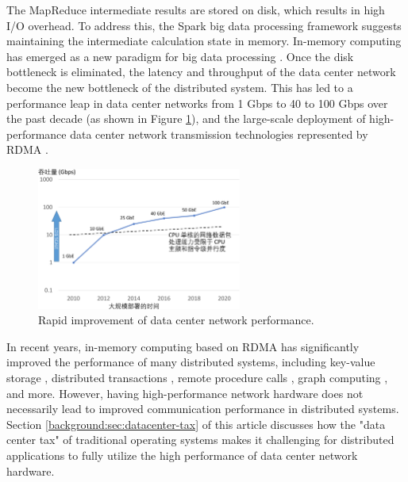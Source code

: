 The MapReduce intermediate results are stored on disk, which results in high I/O overhead. To address this, the Spark \cite{zaharia2010spark} big data processing framework suggests maintaining the intermediate calculation state in memory. In-memory computing has emerged as a new paradigm for big data processing \cite{ousterhout2010case,dragojevic2014farm}. Once the disk bottleneck is eliminated, the latency and throughput of the data center network become the new bottleneck of the distributed system. This has led to a performance leap in data center networks from 1 Gbps to 40 to 100 Gbps over the past decade \cite{al2008scalable} (as shown in Figure \ref{background:fig:network-perf-trend}), and the large-scale deployment of high-performance data center network transmission technologies represented by RDMA \cite{guo2016rdma}.

\begin{figure}[htbp]
	\centering
	\includegraphics[width=0.6\textwidth]{figures/network_perf_trend.pdf}
	\caption{Rapid improvement of data center network performance.}
	\label{background:fig:network-perf-trend}
\end{figure}

In recent years, in-memory computing based on RDMA has significantly improved the performance of many distributed systems, including key-value storage \cite{dragojevic2014farm}, distributed transactions \cite{wei2015fast,chen2016fast,wei2018deconstructing}, remote procedure calls \cite{kalia2016fasst}, graph computing \cite{wang2018fast}, and more. However, having high-performance network hardware does not necessarily lead to improved communication performance in distributed systems. Section \ref{background:sec:datacenter-tax} of this article discusses how the "data center tax" of traditional operating systems makes it challenging for distributed applications to fully utilize the high performance of data center network hardware.

